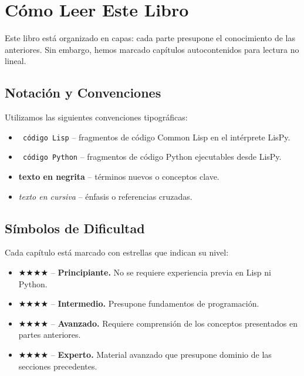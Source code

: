 \chapter{Cómo Leer Este Libro}
\label{chap:howtoread}

Este libro está organizado en capas: cada parte presupone el conocimiento de
las anteriores. Sin embargo, hemos marcado capítulos autocontenidos para
lectura no lineal.

\section{Notación y Convenciones}

Utilizamos las siguientes convenciones tipográficas:

\begin{itemize}
\item \texttt{\color{keywordblue} código Lisp} -- fragmentos de código
  Common Lisp en el intérprete LisPy.
\item \texttt{\color{keywordblue} código Python} -- fragmentos de código
  Python ejecutables desde LisPy.
\item \textbf{texto en negrita} -- términos nuevos o conceptos clave.
\item \textit{texto en cursiva} -- énfasis o referencias cruzadas.
\end{itemize}

\section{Símbolos de Dificultad}

Cada capítulo está marcado con estrellas que indican su nivel:

\begin{itemize}
\item $\bigstar$\!$\bigstar$\!$\bigstar$\!$\bigstar$ -- \textbf{Principiante.}
  No se requiere experiencia previa en Lisp ni Python.
\item $\bigstar$\!$\bigstar$\!$\bigstar$\!$\bigstar$ -- \textbf{Intermedio.}
  Presupone fundamentos de programación.
\item $\bigstar$\!$\bigstar$\!$\bigstar$\!$\bigstar$ -- \textbf{Avanzado.}
  Requiere comprensión de los conceptos presentados en partes anteriores.
\item $\bigstar$\!$\bigstar$\!$\bigstar$\!$\bigstar$ -- \textbf{Experto.}
  Material avanzado que presupone dominio de las secciones precedentes.
\end{itemize}

